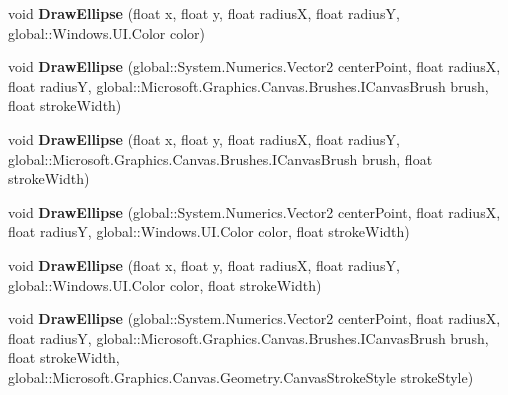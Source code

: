 \begin{DoxyCompactItemize}
void {\bfseries Draw\+Ellipse} (float x, float y, float radiusX, float radiusY, global\+::\+Windows.\+U\+I.\+Color color)
\item 
\mbox{\label{interface_microsoft_1_1_graphics_1_1_canvas_1_1_i_canvas_drawing_session_a8e7eae25b784a8eef3dfc6e6cc77180d}} 
void {\bfseries Draw\+Ellipse} (global\+::\+System.\+Numerics.\+Vector2 center\+Point, float radiusX, float radiusY, global\+::\+Microsoft.\+Graphics.\+Canvas.\+Brushes.\+I\+Canvas\+Brush brush, float stroke\+Width)
\item 
\mbox{\label{interface_microsoft_1_1_graphics_1_1_canvas_1_1_i_canvas_drawing_session_a3c49f5eafa426013a87599137c98c37d}} 
void {\bfseries Draw\+Ellipse} (float x, float y, float radiusX, float radiusY, global\+::\+Microsoft.\+Graphics.\+Canvas.\+Brushes.\+I\+Canvas\+Brush brush, float stroke\+Width)
\item 
\mbox{\label{interface_microsoft_1_1_graphics_1_1_canvas_1_1_i_canvas_drawing_session_a850410c107d5f9f16b6774e335882f54}} 
void {\bfseries Draw\+Ellipse} (global\+::\+System.\+Numerics.\+Vector2 center\+Point, float radiusX, float radiusY, global\+::\+Windows.\+U\+I.\+Color color, float stroke\+Width)
\item 
\mbox{\label{interface_microsoft_1_1_graphics_1_1_canvas_1_1_i_canvas_drawing_session_a02e1b706897eed3f7dd80163aa2277e2}} 
void {\bfseries Draw\+Ellipse} (float x, float y, float radiusX, float radiusY, global\+::\+Windows.\+U\+I.\+Color color, float stroke\+Width)
\item 
\mbox{\label{interface_microsoft_1_1_graphics_1_1_canvas_1_1_i_canvas_drawing_session_aacdef05a2582c36a0d75c08d97c16c6f}} 
void {\bfseries Draw\+Ellipse} (global\+::\+System.\+Numerics.\+Vector2 center\+Point, float radiusX, float radiusY, global\+::\+Microsoft.\+Graphics.\+Canvas.\+Brushes.\+I\+Canvas\+Brush brush, float stroke\+Width, global\+::\+Microsoft.\+Graphics.\+Canvas.\+Geometry.\+Canvas\+Stroke\+Style stroke\+Style)
\item 

\end{DoxyCompactItemize}
